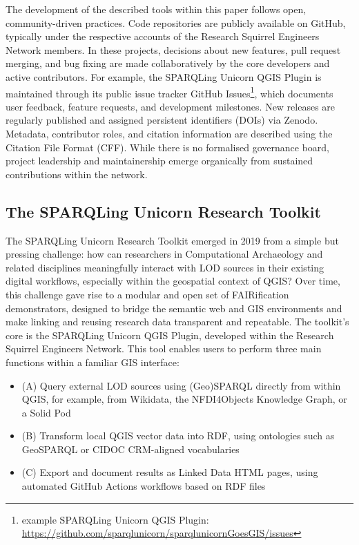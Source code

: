\documentclass{eceasst}
\begin{document}
The development of the described tools within this paper follows open, community-driven practices. Code repositories are publicly available on GitHub, typically under the respective accounts of the Research Squirrel Engineers Network members. In these projects, decisions about new features, pull request merging, and bug fixing are made collaboratively by the core developers and active contributors. For example, the SPARQLing Unicorn QGIS Plugin is maintained through its public issue tracker GitHub Issues\footnote{example SPARQLing Unicorn QGIS Plugin: \url{https://github.com/sparqlunicorn/sparqlunicornGoesGIS/issues}}, which documents user feedback, feature requests, and development milestones. New releases are regularly published and assigned persistent identifiers (DOIs) via Zenodo. Metadata, contributor roles, and citation information are described using the Citation File Format (CFF). While there is no formalised governance board, project leadership and maintainership emerge organically from sustained contributions within the network.

\subsection{The SPARQLing Unicorn Research Toolkit}\label{sec:32}

The SPARQLing Unicorn Research Toolkit emerged in 2019 from a simple but pressing challenge: how can researchers in Computational Archaeology and related disciplines meaningfully interact with LOD sources in their existing digital workflows, especially within the geospatial context of QGIS? Over time, this challenge gave rise to a modular and open set of FAIRification demonstrators, designed to bridge the semantic web and GIS environments and make linking and reusing research data transparent and repeatable. The toolkit's core is the SPARQLing Unicorn QGIS Plugin, developed within the Research Squirrel Engineers Network. This tool enables users to perform three main functions within a familiar GIS interface:

\begin{itemize}
    \item (A) Query external LOD sources using (Geo)SPARQL directly from within QGIS, for example, from Wikidata, the NFDI4Objects Knowledge Graph, or a Solid Pod
    \item (B) Transform local QGIS vector data into RDF, using ontologies such as GeoSPARQL or CIDOC CRM-aligned vocabularies
    \item (C) Export and document results as Linked Data HTML pages, using automated GitHub Actions workflows based on RDF files
\end{itemize}
\end{document}
